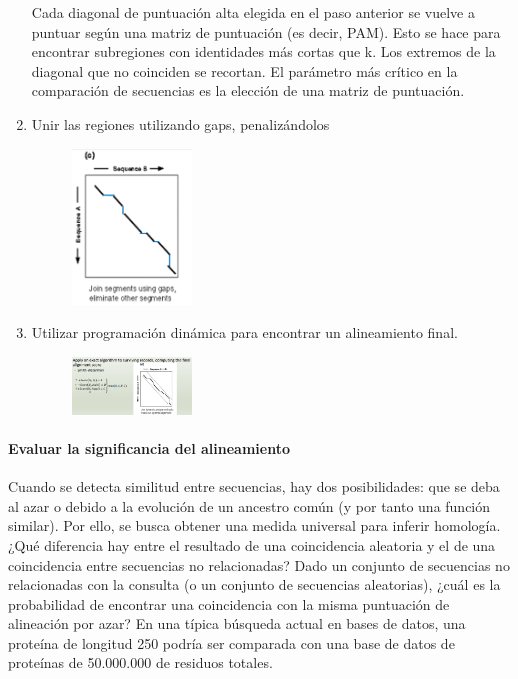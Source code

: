 \begin{enumerate}
Cada diagonal de puntuación alta elegida en el paso anterior se vuelve a puntuar según una matriz de puntuación (es decir, PAM). Esto se hace para encontrar subregiones con identidades más cortas que k. Los extremos de la diagonal que no coinciden se recortan. El parámetro más crítico en la comparación de secuencias es la elección de una matriz de puntuación.

\item Unir las regiones utilizando gaps, penalizándolos
\begin{figure}[h]
\centering
\includegraphics[width = 0.3\textwidth]{figs/join-segments.png}
\end{figure}

\item Utilizar programación dinámica para encontrar un alineamiento final.
\begin{figure}[h]
\centering
\includegraphics[width = 0.3\textwidth]{figs/final-fasta.png}
\end{figure}
\end{enumerate}

\paragraph{Evaluar la significancia del alineamiento}
Cuando se detecta similitud entre secuencias, hay dos posibilidades: que se deba al azar o debido a la evolución de un ancestro común (y por tanto una función similar). Por ello, se busca obtener una medida universal para inferir homología. ¿Qué diferencia hay entre el resultado de una coincidencia aleatoria y el de una coincidencia entre secuencias no relacionadas? Dado un conjunto de secuencias no relacionadas con la consulta (o un conjunto de secuencias aleatorias), ¿cuál es la probabilidad de encontrar una coincidencia con la misma puntuación de alineación por azar?
En una típica búsqueda actual en bases de datos, una proteína de longitud 250 podría ser comparada con una base de datos de proteínas de 50.000.000 de residuos totales.

